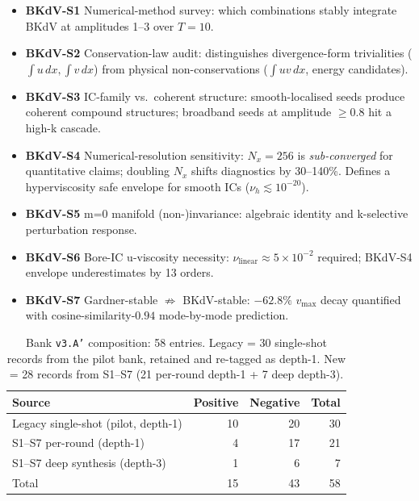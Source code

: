 \begin{itemize}\itemsep0pt
  \item \textbf{BKdV-S1} Numerical-method survey: which combinations stably
        integrate BKdV at amplitudes 1--3 over $T=10$.
  \item \textbf{BKdV-S2} Conservation-law audit: distinguishes
        divergence-form trivialities ($\int u\,dx, \int v\,dx$) from physical
        non-conservations ($\int u v\,dx$, energy candidates).
  \item \textbf{BKdV-S3} IC-family vs.\ coherent structure: smooth-localised
        seeds produce coherent compound structures; broadband seeds at
        amplitude $\geq 0.8$ hit a high-k cascade.
  \item \textbf{BKdV-S4} Numerical-resolution sensitivity: $N_x{=}256$ is
        \emph{sub-converged} for quantitative claims; doubling $N_x$ shifts
        diagnostics by 30--140\%. Defines a hyperviscosity safe envelope for
        smooth ICs ($\nu_h \lesssim 10^{-20}$).
  \item \textbf{BKdV-S5} m{=}0 manifold (non-)invariance: algebraic identity
        and k-selective perturbation response.
  \item \textbf{BKdV-S6} Bore-IC u-viscosity necessity:
        $\nu_\text{linear} \approx 5\times 10^{-2}$ required; BKdV-S4
        envelope underestimates by 13 orders.
  \item \textbf{BKdV-S7} Gardner-stable $\not\Rightarrow$ BKdV-stable:
        $-62.8\%$ $v_{\max}$ decay quantified with cosine-similarity-$0.94$
        mode-by-mode prediction.
\end{itemize}

\begin{table}[tb]
\centering
\caption{Bank \texttt{v3.A'} composition: 58 entries. Legacy = 30 single-shot
records from the pilot bank, retained and re-tagged as depth-1. New = 28
records from S1--S7 (21 per-round depth-1 + 7 deep depth-3).}
\label{tab:bkdv-bank-v3}
\small
\begin{tabular}{lrrr}
\toprule
Source & Positive & Negative & Total \\
\midrule
Legacy single-shot (pilot, depth-1)         & 10 & 20 & 30 \\
S1--S7 per-round (depth-1)                  &  4 & 17 & 21 \\
S1--S7 deep synthesis (depth-3)             &  1 &  6 &  7 \\
\midrule
Total                                       & 15 & 43 & 58 \\
\bottomrule
\end{tabular}
\end{table}

